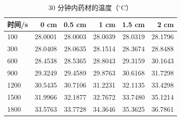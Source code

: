 \begin{table}[H]
  \centering
  \caption{30 分钟内药材的温度（$^\circ$C）}
  \label{tab:p1T}
  \footnotesize
  \begin{tabular}{@{}lrrrrr@{}}
    \toprule
    时间/s & 0 cm & 0.5 cm & 1 cm & 1.5 cm & 2 cm \\
    \midrule
    100 & 28.0001 & 28.0003 & 28.0039 & 28.0319 & 28.1796 \\
    300 & 28.0408 & 28.0635 & 28.1514 & 28.3674 & 28.8488 \\
    600 & 28.4538 & 28.5365 & 28.8043 & 29.3159 & 30.1643 \\
    900 & 29.3249 & 29.4589 & 29.8763 & 30.6168 & 31.7298 \\
    1200 & 30.5435 & 30.7106 & 31.2231 & 32.1135 & 33.4298 \\
    1500 & 31.9966 & 32.1877 & 32.7672 & 33.7480 & 35.1214 \\
    1800 & 33.5763 & 33.7728 & 34.3646 & 35.3625 & 36.7861 \\
    \bottomrule
  \end{tabular}
\end{table}
